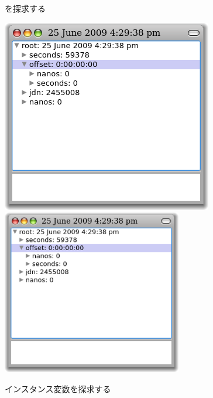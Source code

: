 \documentclass[a4paper,10pt,twoside]{book}
\begin{document}
\begin{figure}[tbp]
\begin{minipage}{0.48\textwidth}
\begin{center}
\end{center}
\caption{  を探求する}
\end{minipage}
\hfill
\begin{minipage}{0.48\textwidth}
\begin{center}
\ifluluelse
{\includegraphics[width=\textwidth]{exploreTimeStampNow2}}
{\includegraphics[width=0.7\textwidth]{exploreTimeStampNow2}}
\end{center}
\caption{インスタンス変数を探求する}
\end{minipage}
\end{figure}
\end{document}
